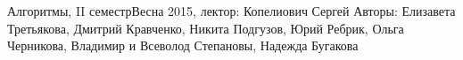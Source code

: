 


\BigHeader
    {Алгоритмы, II семестр}{Весна 2015, лектор: Копелиович Сергей}
    {Авторы: Елизавета Третьякова, Дмитрий Кравченко, Никита Подгузов, Юрий Ребрик, Ольга Черникова, Владимир и Всеволод Степановы, Надежда Бугакова}














